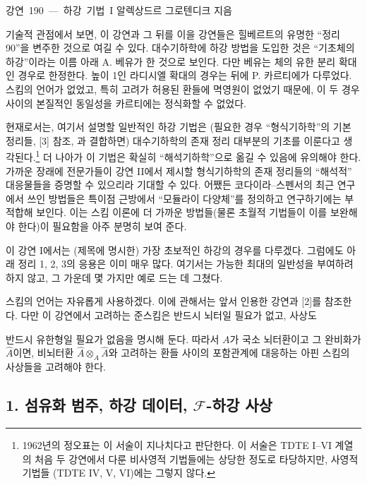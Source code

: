 \unit{강연 190 — 하강 기법 I}
%
  {알렉상드르 그로텐디크 지음}

기술적 관점에서 보면, 이 강연과 그 뒤를 이을 강연들은
힐베르트의 유명한 ``정리 90''을 변주한 것으로 여길 수 있다.
대수기하학에 하강 방법을 도입한 것은 ``기초체의 하강''이라는 이름 아래
A. 베유가 한 것으로 보인다. 다만 베유는 체의 유한 분리 확대인 경우로
한정한다. 높이 1인 라디시엘 확대의 경우는 뒤에 P. 카르티에가 다루었다. 스킴의
언어가 없었고, 특히 고려가 허용된 환들에 멱영원이 없었기 때문에,
이 두 경우 사이의 본질적인 동일성을 카르티에는 정식화할 수
없었다.

현재로서는, 여기서 설명할 일반적인 하강 기법은 (필요한 경우 ``형식기하학''의
기본 정리들, [3] 참조, 과 결합하면) 대수기하학의 존재 정리 대부분의
기초를 이룬다고 생각된다.\footnote{1962년의 정오표는 이 서술이
지나치다고 판단한다. 이 서술은 TDTE I--VI 계열의 처음 두 강연에서 다룬
비사영적 기법들에는 상당한 정도로 타당하지만, 사영적 기법들
(TDTE IV, V, VI)에는 그렇지 않다.} 더 나아가 이 기법은 확실히
``해석기하학''으로 옮길 수 있음에 유의해야 한다. 가까운 장래에
전문가들이 강연 II에서 제시할 형식기하학의 존재 정리들의
``해석적'' 대응물들을 증명할 수 있으리라 기대할 수 있다. 어쨌든
코다이라--스펜서의 최근 연구에서 쓰인 방법들은 특이점 근방에서
``모듈라이 다양체''를 정의하고 연구하기에는 부적합해 보인다. 이는 스킴
이론에 더 가까운 방법들(물론 초월적 기법들이 이를 보완해야 한다)이
필요함을 아주 분명히 보여 준다.

이 강연 I에서는 (제목에 명시한) 가장 초보적인 하강의 경우를
다루겠다. 그럼에도 아래 정리 1, 2, 3의 응용은 이미 매우 많다.
여기서는 가능한 최대의 일반성을 부여하려 하지 않고, 그 가운데 몇 가지만
예로 드는 데 그쳤다.

스킴의 언어는 자유롭게 사용하겠다. 이에 관해서는 앞서 인용한 강연과
[2]를 참조한다. 다만 이 강연에서 고려하는 준스킴은 반드시
뇌터일 필요가 없고, 사상도

반드시 유한형일 필요가 없음을 명시해 둔다. 따라서 $A$가 국소 뇌터환이고
그 완비화가 $\widehat A$이면, 비뇌터환 $\widehat A\otimes_A\widehat A$와
고려하는 환들 사이의 포함관계에 대응하는 아핀 스킴의 사상들을
고려해야 한다.


\subsection*{1. 섬유화 범주, 하강 데이터, $\mathcal F$-하강
사상}

